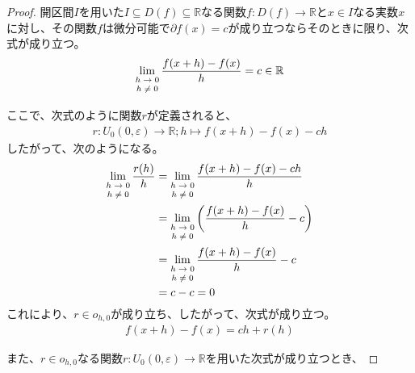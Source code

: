 \documentclass[dvipdfmx]{jsarticle}
\begin{document}
\begin{proof}
開区間$I$を用いた$I \subseteq D(f) \subseteq \mathbb{R}$なる関数$f:D(f) \rightarrow \mathbb{R}$と$x \in I$なる実数$x$に対し、その関数$f$は微分可能で$\partial f(x) = c$が成り立つならそのときに限り、次式が成り立つ。
\begin{align*}
\lim_{\scriptsize \begin{matrix}
h \rightarrow 0 \\
h \neq 0 \\
\end{matrix}}\frac{f(x + h) - f(x)}{h} = c \in \mathbb{R}
\end{align*}\par
ここで、次式のように関数$r$が定義されると、
\begin{align*}
r:U_{0}(0,\varepsilon) \rightarrow \mathbb{R};h \mapsto f(x + h) - f(x) - ch
\end{align*}
したがって、次のようになる。
\begin{align*}
\lim_{\scriptsize \begin{matrix}
h \rightarrow 0 \\
h \neq 0 \\
\end{matrix}}\frac{r(h)}{h} &= \lim_{\scriptsize \begin{matrix}
h \rightarrow 0 \\
h \neq 0 \\
\end{matrix}}\frac{f(x + h) - f(x) - ch}{h} \\
&= \lim_{\scriptsize \begin{matrix}
h \rightarrow 0 \\
h \neq 0 \\
\end{matrix}}\left( \frac{f(x + h) - f(x)}{h} - c \right)\\
&= \lim_{\scriptsize \begin{matrix}
h \rightarrow 0 \\
h \neq 0 \\
\end{matrix}}\frac{f(x + h) - f(x)}{h} - c \\
&= c - c = 0
\end{align*}
これにより、$r \in o_{h,0}$が成り立ち、したがって、次式が成り立つ。
\begin{align*}
f(x + h) - f(x) = ch + r(h)
\end{align*}\par
また、$r \in o_{h,0}$なる関数$r:U_{0}(0,\varepsilon) \rightarrow \mathbb{R}$を用いた次式が成り立つとき、

\end{proof}
\end{document}
